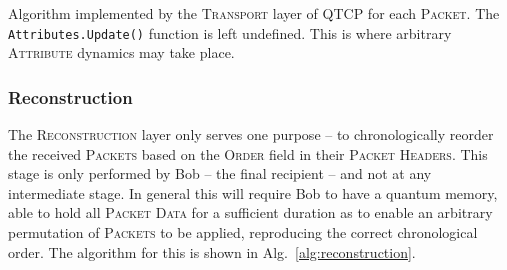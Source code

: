 \begin{table}[htpb]
\caption{Algorithm implemented by the \textsc{Transport} layer of QTCP for each \textsc{Packet}. The \texttt{Attributes.Update()} function is left undefined. This is where arbitrary \textsc{Attribute} dynamics may take place.} \label{alg:transport_alg}
\end{table}

%
%

\subsubsection{Reconstruction}  \label{sec:reconstruction_layer}

The \textsc{Reconstruction} layer only serves one purpose -- to chronologically reorder the received \textsc{Packets} based on the \textsc{Order} field in their \textsc{Packet Headers}. This stage is only performed by Bob -- the final recipient -- and not at any intermediate stage. In general this will require Bob to have a quantum memory, able to hold all \textsc{Packet Data} for a sufficient duration as to enable an arbitrary permutation of \textsc{Packets} to be applied, reproducing the correct chronological order. The algorithm for this is shown in Alg.~\ref{alg:reconstruction}.


